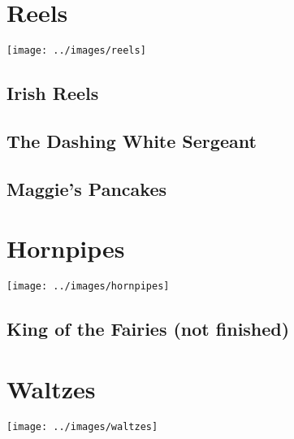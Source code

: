 \documentclass[12pt]{report}
\newcommand*{\cleartoleftpage}{%
	\clearpage
	\ifodd\value{page}\hbox{}\newpage\fi
}
\begin{document}
\cleartoleftpage
\chapter*{Reels}
\begin{center}
\texttt{[image: ../images/reels]}
\end{center}

	\section*{Irish Reels}
	

	\cleartoleftpage
	\section*{The Dashing White Sergeant}
	

	\cleartoleftpage
	\section*{Maggie's Pancakes}
	

\cleartoleftpage
\chapter*{Hornpipes}
\begin{center}
\texttt{[image: ../images/hornpipes]}
\end{center}

	\section*{King of the Fairies (not finished)}
	

\cleartoleftpage
\chapter*{Waltzes}
\begin{center}
\texttt{[image: ../images/waltzes]}
\end{center}
\end{document}
